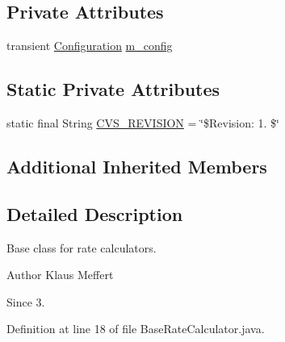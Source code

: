 \subsection*{Private Attributes}
\begin{DoxyCompactItemize}
\item 
transient \hyperlink{classorg_1_1jgap_1_1_configuration}{Configuration} \hyperlink{classorg_1_1jgap_1_1_base_rate_calculator_a8d44e6ee2a72e6249cf1f6a85de3c5ea}{m\-\_\-config}
\end{DoxyCompactItemize}
\subsection*{Static Private Attributes}
\begin{DoxyCompactItemize}
\item 
static final String \hyperlink{classorg_1_1jgap_1_1_base_rate_calculator_a62f95e305b9eb1d71549fb91bbd7b013}{C\-V\-S\-\_\-\-R\-E\-V\-I\-S\-I\-O\-N} = \char`\"{}\$Revision\-: 1. \$\char`\"{}
\end{DoxyCompactItemize}
\subsection*{Additional Inherited Members}


\subsection{Detailed Description}
Base class for rate calculators.

\begin{DoxyAuthor}{Author}
Klaus Meffert 
\end{DoxyAuthor}
\begin{DoxySince}{Since}
3. 
\end{DoxySince}


Definition at line 18 of file Base\-Rate\-Calculator.\-java.



